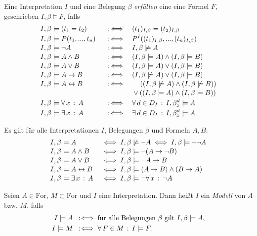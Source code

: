 \documentclass{cheat-sheet}
\newcommand{\Ibm}{I, \beta \models}
\newcommand{\Ibnm}{I, \beta \not\models}
\newcommand{\Iba}[1]{(#1)_{I,\beta}} %
\newcommand{\lra}{\leftrightarrow}
\newcommand{\For}{\mathrm{For}} %
\begin{document}
\begin{defn}
  Eine Interpretation $I$ und eine Belegung $\beta$ \emph{erfüllen} eine eine Formel $F$, geschrieben $I, \beta \models F$, falls
  \begin{alignat*}{3}
    & \Ibm (t_1 = t_2) &&\coloniff&& \Iba{t_1} = \Iba{t_2}\\[-2pt]
    & \Ibm P(t_1, ..., t_n) &&\coloniff&& P^I(\Iba{t_1}, ..., \Iba{t_n}) \\[-2pt]
    & \Ibm \neg A &&\coloniff&& \Ibnm A \\[-2pt]
    & \Ibm A \wedge B &&\coloniff&& (\Ibm A) \wedge (\Ibm B) \\[-2pt]
    & \Ibm A \vee B &&\coloniff&& (\Ibm A) \vee (\Ibm B) \\[-2pt]
    & \Ibm A \to B &&\coloniff&& (\Ibnm A) \vee (\Ibm B) \\[-2pt]
    & \Ibm A \lra B &&\coloniff&& \quad\, ((\Ibnm A) \wedge (\Ibnm B))\\[-2pt]
    & && && \vee ((\Ibm A) \wedge (\Ibm B)) \\[-2pt]
    & \Ibm \fa{x} A &&\coloniff&& \fa{d \in D_I} I, \beta_x^d \models A \\[-2pt]
    & \Ibm \ex{x} A &&\coloniff&& \ex{d \in D_I} I, \beta_x^d \models A
  \end{alignat*}
\end{defn}


\begin{prop}
  Es gilt für alle Interpretationen $I$, Belegungen $\beta$ und Formeln $A, B$:
  \begin{alignat*}{2}
    & \Ibm A &&\iff \Ibnm \neg A \iff \Ibm \neg\neg A\\[-2pt]
    & \Ibm A \wedge B &&\iff \Ibm \neg (A \to \neg B)\\[-2pt]
    & \Ibm A \vee B &&\iff \Ibm \neg A \to B\\[-2pt]
    & \Ibm A \lra B &&\iff \Ibm (A \to B) \wedge (B \to A)\\[-2pt]
    & \Ibm \ex{x} A &&\iff \Ibm \neg \fa{x} \neg A
  \end{alignat*}
\end{prop}


\begin{defn}
  Seien $A \in \For$, $M \subset \For$ und $I$ eine Interpretation. Dann heißt $I$ ein \emph{Modell} von $A$ bzw. $M$, falls
  \begin{align*}
    I \models A &\coloniff \text{für alle Belegungen $\beta$ gilt } \Ibm A,\\
    I \models M &\coloniff \fa{F \in M} I \models F.
  \end{align*}
\end{defn}
\end{document}
